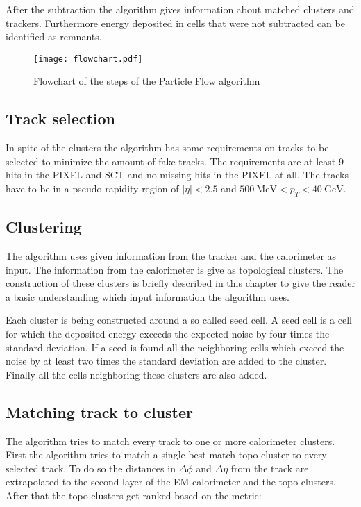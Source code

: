 After the subtraction the algorithm gives information about matched clusters and trackers. Furthermore energy deposited in cells that were not subtracted can be identified as remnants. 

\begin{figure}[h]
  \centering
  \texttt{[image: flowchart.pdf]}
  \caption[Flowchart of the steps of the Particle Flow algorithm]{Flowchart of the steps of the Particle Flow algorithm \cite{pflow16}}
  \label{fig:pflowflowchart}
\end{figure}

\subsection{Track selection}

In spite of the clusters the algorithm has some requirements on tracks to be selected to minimize the amount of fake tracks. The requirements are at least 9 hits in the PIXEL and SCT and no missing hits in the PIXEL at all. The tracks have to be in a pseudo-rapidity region of $|\eta|<2.5$ and $\SI{500}{\MeV}<p_T<\SI{40}{\GeV}$.




\subsection{Clustering}

The algorithm uses given information from the tracker and the calorimeter as input. The information from the calorimeter is give as topological clusters. The construction of these clusters is briefly described in this chapter to give the reader a basic understanding which input information the algorithm uses.

Each cluster is being constructed around a so called seed cell. A seed cell is a cell for which the deposited energy exceeds the expected noise by four times the standard deviation. If a seed is found all the neighboring cells which exceed the noise by at least two times the standard deviation are added to the cluster. Finally all the cells neighboring these clusters are also added.


\subsection{Matching track to cluster}

The algorithm tries to match every track to one or more calorimeter clusters. First the algorithm tries to match a single best-match topo-cluster to every selected track.
To do so the distances in $\Delta \phi$ and $\Delta \eta$ from the track are extrapolated to the second layer of the EM calorimeter and the topo-clusters. After that the topo-clusters get ranked based on the metric:

